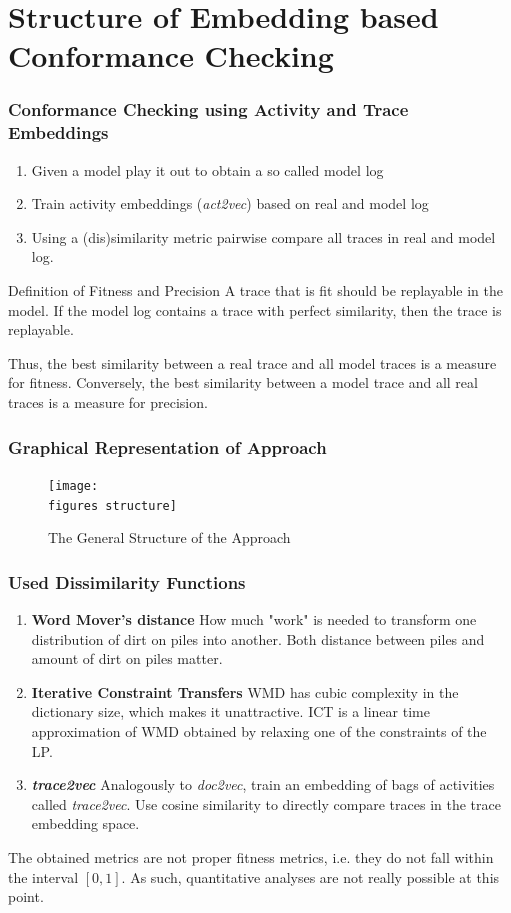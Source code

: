 \documentclass{beamer}
\newcommand{\figures}{../figures/}
\begin{document}
	\section{Structure of Embedding based Conformance Checking}
\begin{frame}
	\frametitle{Conformance Checking using Activity and Trace Embeddings}
	\begin{enumerate}
		\item Given a model play it out to obtain a so called model log
		\item Train activity embeddings (\emph{act2vec}) based on real and model log
		\item Using a (dis)similarity metric pairwise compare all traces in real and model log.
	\end{enumerate}
\begin{block}{Definition of Fitness and Precision}
	A trace that is fit should be replayable in the model. If the model log contains a trace with perfect similarity, then the trace is replayable.
	
	Thus, the best similarity between a real trace and all model traces is a measure for fitness. Conversely, the best similarity between a model trace and all real traces is a measure for precision.
\end{block}
\end{frame}
	
	
	\begin{frame}
		\frametitle{Graphical Representation of Approach}
		\begin{figure}
			\texttt{[image: \\figures structure]}
			\caption{The General Structure of the Approach}
			\label{fig:structure}
		\end{figure}
	\end{frame}
	
	
	\begin{frame}
		\frametitle{Used Dissimilarity Functions}
		\begin{enumerate}
			\item \textbf{Word Mover's distance} \cite{KSKW15} How much "work" is needed to transform one distribution of dirt on piles into another. Both distance between piles and amount of dirt on piles matter.
			\item \textbf{Iterative Constraint Transfers} \cite{AtMi18} WMD has cubic complexity in the dictionary size, which makes it unattractive. ICT is a linear time approximation of WMD obtained by relaxing one of the constraints of the LP.
			\item \textbf{\emph{trace2vec}} \cite{KBWe18} Analogously to \emph{doc2vec}, train an embedding of bags of activities called \emph{trace2vec}. Use cosine similarity to directly compare traces in the trace embedding space.
		\end{enumerate}
	\alert{The obtained metrics are not proper fitness metrics, i.e. they do not fall within the interval $[0,1]$. As such, quantitative analyses are not really possible at this point.}
	\end{frame}
	
\end{document}
